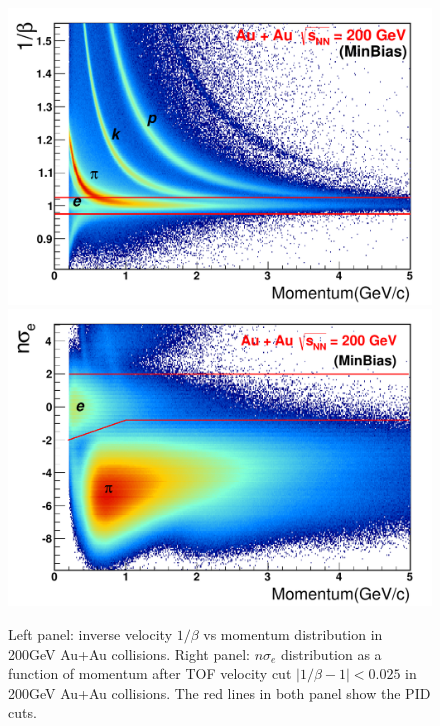 \begin{figure}
\begin{centering}
\includegraphics[scale=0.35]{fig/3.Analysis/Additional/PID/betavsp}\includegraphics[scale=0.35]{fig/3.Analysis/Additional/PID/Nsigma_AuAu200}
\par\end{centering}

\protect\caption{Left panel: inverse velocity $1/\beta$ vs momentum distribution in
200GeV Au+Au collisions. Right panel: $n\sigma_{e}$ distribution
as a function of momentum after TOF velocity cut $|1/\beta-1|<0.025$
in 200GeV Au+Au collisions. The red lines in both panel show the PID
cuts.}


\label{fig:PID}
\end{figure}



